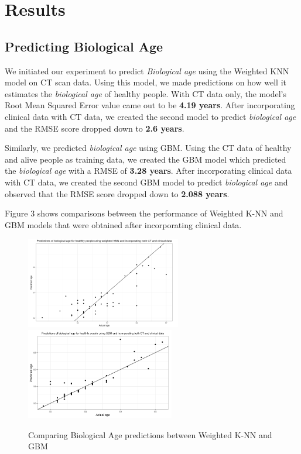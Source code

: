 \documentclass{article}
\begin{document}
\section{Results}

\subsection{Predicting Biological Age}
We initiated our experiment to predict \emph{Biological age} using the Weighted KNN model on CT scan data. Using this model, we made predictions on how well it estimates the \emph{biological age} of healthy people. With CT data only, the model's Root Mean Squared Error value came out to be \textbf{4.19 years}. After incorporating clinical data with CT data, we created the second model to predict \emph{biological age} and the RMSE score dropped down to \textbf{2.6 years}. 

Similarly, we predicted \emph{biological age} using GBM. Using the CT data of healthy and alive people as training data, we created the GBM model which predicted the \emph{biological age} with a RMSE of \textbf{3.28 years}. After incorporating clinical data with CT data, we created the second GBM model to predict \emph{biological age} and observed that the RMSE score dropped down to \textbf{2.088 years}.

Figure 3 shows comparisons between the performance of Weighted K-NN and GBM models that were obtained after incorporating clinical data.

\begin{figure}[h]
\includegraphics[height=4cm]{fig1-5}\includegraphics[height=4cm]{fig1-7}
\caption{Comparing Biological Age predictions between Weighted K-NN and GBM}
\end{figure}
\end{document}
